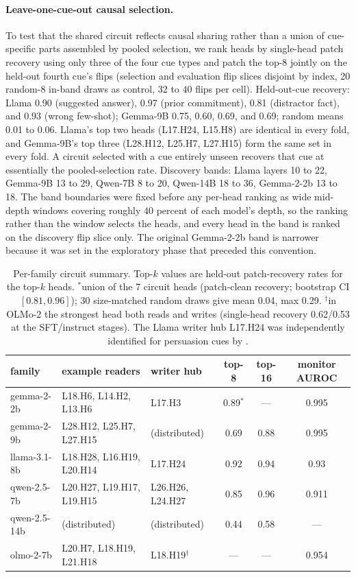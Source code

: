 \documentclass{article}
\begin{document}
\paragraph{Leave-one-cue-out causal selection.} To test that the shared circuit reflects causal sharing rather than a union of cue-specific parts assembled by pooled selection, we rank heads by single-head patch recovery using only three of the four cue types and patch the top-8 jointly on the held-out fourth cue's flips (selection and evaluation flip slices disjoint by index, 20 random-8 in-band draws as control, 32 to 40 flips per cell). Held-out-cue recovery: Llama 0.90 (suggested answer), 0.97 (prior commitment), 0.81 (distractor fact), and 0.93 (wrong few-shot); Gemma-9B 0.75, 0.60, 0.69, and 0.69; random means 0.01 to 0.06. Llama's top two heads (L17.H24, L15.H8) are identical in every fold, and Gemma-9B's top three (L28.H12, L25.H7, L27.H15) form the same set in every fold. A circuit selected with a cue entirely unseen recovers that cue at essentially the pooled-selection rate. Discovery bands: Llama layers 10 to 22, Gemma-9B 13 to 29, Qwen-7B 8 to 20, Qwen-14B 18 to 36, Gemma-2-2b 13 to 18. The band boundaries were fixed before any per-head ranking as wide mid-depth windows covering roughly 40 percent of each model's depth, so the ranking rather than the window selects the heads, and every head in the band is ranked on the discovery flip slice only. The original Gemma-2-2b band is narrower because it was set in the exploratory phase that preceded this convention.

\begin{table}[h]
\centering\small
\setlength{\tabcolsep}{5pt}
\begin{tabular}{lllccc}
\toprule
family & example readers & writer hub & top-8 & top-16 & monitor AUROC \\
\midrule
gemma-2-2b & L18.H6, L14.H2, L13.H6 & L17.H3 & 0.89$^{*}$ & --- & 0.995 \\
gemma-2-9b & L28.H12, L25.H7, L27.H15 & (distributed) & 0.69 & 0.88 & 0.995 \\
llama-3.1-8b & L18.H28, L16.H19, L20.H14 & L17.H24 & 0.92 & 0.94 & 0.93 \\
qwen-2.5-7b & L20.H27, L19.H17, L19.H15 & L26.H26, L24.H27 & 0.85 & 0.96 & 0.911 \\
qwen-2.5-14b & (distributed) & (distributed) & 0.44 & 0.58 & --- \\
olmo-2-7b & L20.H7, L18.H19, L21.H18 & L18.H19$^{\dagger}$ & --- & --- & 0.954 \\
\bottomrule
\end{tabular}
\caption{Per-family circuit summary. Top-$k$ values are held-out patch-recovery rates for the top-$k$ heads. $^{*}$union of the 7 circuit heads (patch-clean recovery; bootstrap CI $[0.81, 0.96]$); 30 size-matched random draws give mean 0.04, max 0.29. $^{\dagger}$in OLMo-2 the strongest head both reads and writes (single-head recovery 0.62/0.53 at the SFT/instruct stages). The Llama writer hub L17.H24 was independently identified for persuasion cues by \citet{sun2026persuaded}.}
\label{tab:replication}
\end{table}
\end{document}
